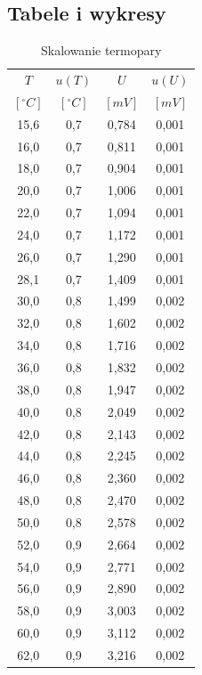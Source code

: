 \documentclass[polish, 11pt, a4paper]{article}
\begin{document}
	\subsection{Tabele i wykresy}
		\begin{table}[H]
			\begin{minipage}{.5\textwidth}
				\caption{Skalowanie termopary}
				\centering
				\begin{tabular}{|c|c|c|c|}\hline
					\(T\)	&	\(u(T)\) 	&	\(U\) 	&	\(u(U)\) 	\\
					\([^\circ C]\)	&	\([^\circ C]\)	&	\([mV]\)	&	\([mV]\)	\\\hline
					15,6	&	0,7	&	0,784	&	0,001	\\\hline
					16,0	&	0,7	&	0,811	&	0,001	\\\hline
					18,0	&	0,7	&	0,904	&	0,001	\\\hline
					20,0	&	0,7	&	1,006	&	0,001	\\\hline
					22,0	&	0,7	&	1,094	&	0,001	\\\hline
					24,0	&	0,7	&	1,172	&	0,001	\\\hline
					26,0	&	0,7	&	1,290	&	0,001	\\\hline
					28,1	&	0,7	&	1,409	&	0,001	\\\hline
					30,0	&	0,8	&	1,499	&	0,002	\\\hline
					32,0	&	0,8	&	1,602	&	0,002	\\\hline
					34,0	&	0,8	&	1,716	&	0,002	\\\hline
					36,0	&	0,8	&	1,832	&	0,002	\\\hline
					38,0	&	0,8	&	1,947	&	0,002	\\\hline
					40,0	&	0,8	&	2,049	&	0,002	\\\hline
					42,0	&	0,8	&	2,143	&	0,002	\\\hline
					44,0	&	0,8	&	2,245	&	0,002	\\\hline
					46,0	&	0,8	&	2,360	&	0,002	\\\hline
					48,0	&	0,8	&	2,470	&	0,002	\\\hline
					50,0	&	0,8	&	2,578	&	0,002	\\\hline
					52,0	&	0,9	&	2,664	&	0,002	\\\hline
					54,0	&	0,9	&	2,771	&	0,002	\\\hline
					56,0	&	0,9	&	2,890	&	0,002	\\\hline
					58,0	&	0,9	&	3,003	&	0,002	\\\hline
					60,0	&	0,9	&	3,112	&	0,002	\\\hline
					62,0	&	0,9	&	3,216	&	0,002	\\\hline

\end{tabular}
\end{minipage}
\end{table}
\end{document}
